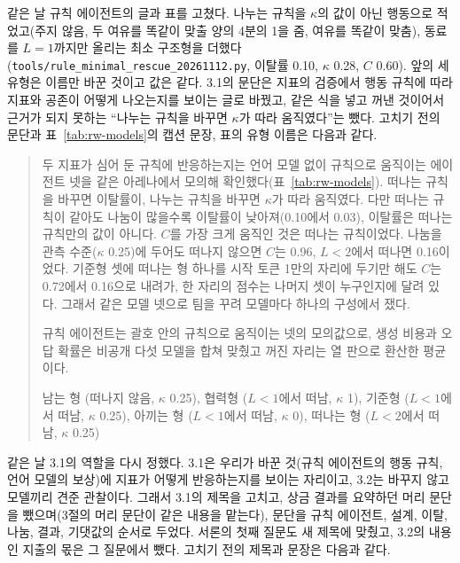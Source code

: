 같은 날 규칙 에이전트의 글과 표를 고쳤다. 나누는 규칙을 $\kappa$의 값이 아닌 행동으로 적었고(주지 않음, 두 여유를 똑같이 맞출 양의 4분의 1을 줌, 여유를 똑같이 맞춤), 동료를 $L=1$까지만 올리는 최소 구조형을 더했다(\texttt{tools/rule\_minimal\_rescue\_20261112.py}, 이탈률 0.10, $\kappa$ 0.28, $C$ 0.60). 앞의 세 유형은 이름만 바꾼 것이고 값은 같다. 3.1의 문단은 지표의 검증에서 행동 규칙에 따라 지표와 공존이 어떻게 나오는지를 보이는 글로 바꿨고, 같은 식을 넣고 꺼낸 것이어서 근거가 되지 못하는 ``나누는 규칙을 바꾸면 $\kappa$가 따라 움직였다''는 뺐다. 고치기 전의 문단과 표~\ref{tab:rw-models}의 캡션 문장, 표의 유형 이름은 다음과 같다.

\begin{quote}\small
{\color{black}두 지표가 심어 둔 규칙에 반응하는지는 언어 모델 없이 규칙으로 움직이는 에이전트 넷을 같은 아레나에서 모의해 확인했다(표~\ref{tab:rw-models}). 떠나는 규칙을 바꾸면 이탈률이, 나누는 규칙을 바꾸면 $\kappa$가 따라 움직였다. 다만 떠나는 규칙이 같아도 나눔이 많을수록 이탈률이 낮아져(0.10에서 0.03), 이탈률은 떠나는 규칙만의 값이 아니다. $C$를 가장 크게 움직인 것은 떠나는 규칙이었다. 나눔을 관측 수준($\kappa$ 0.25)에 두어도 떠나지 않으면 $C$는 0.96, $L<2$에서 떠나면 0.16이었다. 기준형 셋에 떠나는 형 하나를 시작 토큰 1만의 자리에 두기만 해도 $C$는 0.72에서 0.16으로 내려가, 한 자리의 점수는 나머지 셋이 누구인지에 달려 있다. 그래서 같은 모델 넷으로 팀을 꾸려 모델마다 하나의 구성에서 쟀다.}

규칙 에이전트는 괄호 안의 규칙으로 움직이는 넷의 모의값으로, 생성 비용과 오답 확률은 비공개 다섯 모델을 합쳐 맞췄고 꺼진 자리는 열 판으로 환산한 평균이다.

남는 형 (떠나지 않음, $\kappa$ 0.25), 협력형 ($L<1$에서 떠남, $\kappa$ 1), 기준형 ($L<1$에서 떠남, $\kappa$ 0.25), 아끼는 형 ($L<1$에서 떠남, $\kappa$ 0), 떠나는 형 ($L<2$에서 떠남, $\kappa$ 0.25)
\end{quote}

같은 날 3.1의 역할을 다시 정했다. 3.1은 우리가 바꾼 것(규칙 에이전트의 행동 규칙, 언어 모델의 보상)에 지표가 어떻게 반응하는지를 보이는 자리이고, 3.2는 바꾸지 않고 모델끼리 견준 관찰이다. 그래서 3.1의 제목을 고치고, 상금 결과를 요약하던 머리 문단을 뺐으며(3절의 머리 문단이 같은 내용을 맡는다), 문단을 규칙 에이전트, 설계, 이탈, 나눔, 결과, 기댓값의 순서로 두었다. 서론의 첫째 질문도 새 제목에 맞췄고, 3.2의 내용인 지출의 몫은 그 질문에서 뺐다. 고치기 전의 제목과 문장은 다음과 같다.


